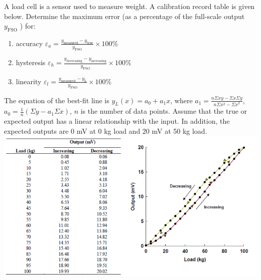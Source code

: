 \documentclass[a4paper,11pt,dvipsnames]{book}
\begin{document}
\begin{question}
A load cell is a sensor used to measure weight. A calibration record table is given below. Determine the maximum error (as a percentage of the full-scale output $y_{\text{FSO}}$ ) for:
 \begin{enumerate}
 \item accuracy $\varepsilon_a = \frac{y_{\text{measured}} - y_{\text{true}}}{y_{\text{FSO}}} \times 100\%$
\item hysteresis $\varepsilon_h = \frac{y_{\text{decreasing}} - y_{\text{increasing}}}{y_{\text{FSO}}} \times 100\%$ 
\item linearity $\varepsilon_l = \frac{y_{\text{measured}} - y_{\text{L}}}{y_{\text{FSO}}} \times 100\%$
\end{enumerate}  
The equation of the best-fit line is $y_L(x) = a_0 + a_1x$, where $a_1=\frac{n\Sigma xy - \Sigma x \Sigma y}{n\Sigma x^2 - {\Sigma x}^2}$, $a_0 = \frac{1}{n}( \Sigma y - a_1 \Sigma x )$, $n$ is the number of data points. Assume that the true or expected output has a linear relationship with the input. In addition, the expected outputs are 0 mV at 0 kg load and 20 mV at 50 kg load. \\
{\centering
\includegraphics[width=\linewidth]{q2} 
}
\end{question}
\end{document}
